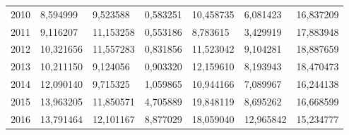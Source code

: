 \begin{table}
\begin{tabular}{p{1cm}p{2cm}p{2cm}p{2cm}p{2cm}p{2cm}p{2cm}}
 2010 &                         8,594999 &                            9,523588 &                              0,583251 &         10,458735 &  6,081423 &          16,837209 \\
 2011 &                         9,116207 &                           11,153258 &                              0,553186 &          8,783615 &  3,429919 &          17,883948 \\
 2012 &                        10,321656 &                           11,557283 &                              0,831856 &         11,523042 &  9,104281 &          18,887659 \\
 2013 &                        10,211150 &                            9,124056 &                              0,903320 &         12,159610 &  8,193943 &          18,470473 \\
 2014 &                        12,090140 &                            9,715325 &                              1,059865 &         10,944166 &  7,089967 &          16,244138 \\
 2015 &                        13,963205 &                           11,850571 &                              4,705889 &         19,848119 &  8,695262 &          16,668599 \\
 2016 &                        13,791464 &                           12,101167 &                              8,877029 &         18,059040 & 12,965842 &          15,234777 \\
\bottomrule
\end{tabular}
\end{table}
